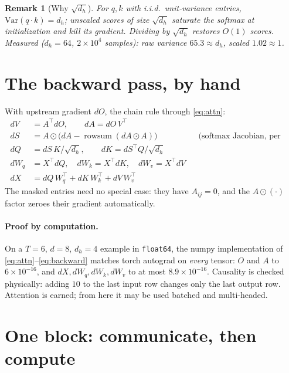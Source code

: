 \documentclass[11pt]{article}
\newtheorem{remark}{Remark}
\begin{document}
\begin{remark}[Why $\sqrt{d_h}$]
For $q, k$ with i.i.d.\ unit-variance entries,
$\mathrm{Var}(q \cdot k) = d_h$; unscaled scores of size
$\sqrt{d_h}$ saturate the softmax at initialization and kill its
gradient. Dividing by $\sqrt{d_h}$ restores $O(1)$ scores. Measured
($d_h = 64$, $2\times10^4$ samples): raw variance $65.3 \approx d_h$,
scaled $1.02 \approx 1$.
\end{remark}

\section{The backward pass, by hand}

With upstream gradient $dO$, the chain rule through \eqref{eq:attn}:
\begin{equation}
  \boxed{\;
  \begin{aligned}
  dV &= A^{\!\top} dO, \qquad dA = dO\, V^{\!\top}\\
  dS &= A \odot \bigl(dA - \operatorname{rowsum}(dA \odot A)\bigr)
     && \text{(softmax Jacobian, per row)}\\
  dQ &= dS\, K / \sqrt{d_h}, \qquad dK = dS^{\!\top} Q / \sqrt{d_h}\\
  dW_q &= X^{\!\top} dQ, \quad dW_k = X^{\!\top} dK, \quad
     dW_v = X^{\!\top} dV\\
  dX &= dQ\, W_q^{\!\top} + dK\, W_k^{\!\top} + dV\, W_v^{\!\top}
  \end{aligned}\;}
  \label{eq:backward}
\end{equation}
The masked entries need no special case: they have $A_{ij} = 0$, and
the $A \odot (\cdot)$ factor zeroes their gradient automatically.

\paragraph{Proof by computation.} On a $T{=}6$, $d{=}8$, $d_h{=}4$
example in \texttt{float64}, the numpy implementation of
\eqref{eq:attn}--\eqref{eq:backward} matches torch autograd on
\emph{every} tensor: $O$ and $A$ to $6\times10^{-16}$, and $dX, dW_q,
dW_k, dW_v$ to at most $8.9\times10^{-16}$. Causality is checked
physically: adding $10$ to the last input row changes only the last
output row. Attention is earned; from here it may be used batched and
multi-headed.

\section{One block: communicate, then compute}
\end{document}
